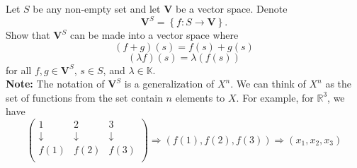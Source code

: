 \begin{exercise}
  Let \( S \) be any non-empty set and let \( \mathbf{V} \) be a vector space. Denote 
  \[ \mathbf{V}^{S} = \left\{ f: S \to \mathbf{V} \right\} .\] 
  Show that \( \mathbf{V}^{S} \) can be made into a vector space where 
  \[ \left( f+g \right)(s)  =f(s) +g(s) \]
  \[ \left( \lambda f \right)(s) = \lambda \left( f(s) \right) \]
  for all \( f,g \in \mathbf{V}^{S} \), \( s \in S \), and \( \lambda \in \mathbb{K} \).\\ 
  \textbf{Note:} The notation of \( \mathbf{V}^{S} \) is a generalization of \( X^{n} \). We can think of \( X^{n} \) as the set of functions from the set contain \( n \) elements to \( X \). For example, for \( \mathbb{R}^{3} \), we have 
  \[ \begin{pmatrix}
    1 & 2 & 3\\
    \downarrow & \downarrow & \downarrow \\
    f(1) & f(2) & f(3)\\
  \end{pmatrix} \Rightarrow \left( f(1), f(2), f(3) \right) \Rightarrow (x_{1}, x_{2}, x_{3})\]
\end{exercise}

